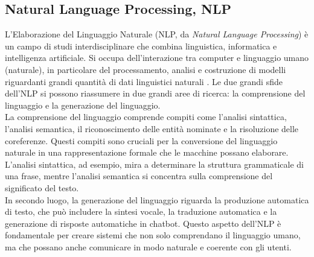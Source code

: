 \documentclass[../../Thesis.tex]{subfiles}
\begin{document}
\subsection{Natural Language Processing, NLP}
L'Elaborazione del Linguaggio Naturale (NLP, da \emph{Natural Language Processing}) è un campo  di studi interdisciplinare che combina linguistica, informatica e intelligenza artificiale. Si occupa dell'interazione tra computer e linguaggio umano (naturale), in particolare del processamento, analisi e costruzione di modelli riguardanti grandi quantità di dati linguistici naturali \cite{jurafsky2009speech}. 
Le due grandi sfide dell'NLP si possono riassumere in due grandi aree di ricerca: la comprensione del linguaggio e la generazione del linguaggio.\\
 La comprensione del linguaggio comprende compiti come l'analisi sintattica, l'analisi semantica, il riconoscimento delle entità nominate e la risoluzione delle coreferenze. Questi compiti sono cruciali per la conversione del linguaggio naturale in una rappresentazione formale che le macchine possano elaborare. L'analisi sintattica, ad esempio, mira a determinare la struttura grammaticale di una frase, mentre l'analisi semantica si concentra sulla comprensione del significato del testo.\\ In secondo luogo, 
la generazione del linguaggio riguarda la produzione automatica di testo, che può includere la sintesi vocale, la traduzione automatica e la generazione di risposte automatiche in chatbot. Questo aspetto dell'NLP è fondamentale per creare sistemi che non solo comprendano il linguaggio umano, ma che possano anche comunicare in modo naturale e coerente con gli utenti.
\end{document}
